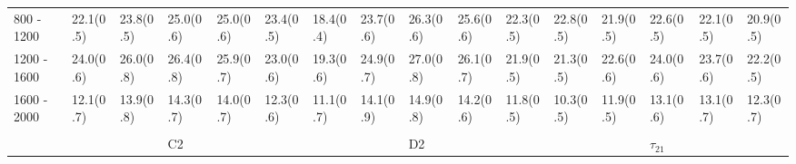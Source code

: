 \begin{table}
{\begin{tabular}{llllllllllllllll}
\multicolumn{1}{l||}{800 - 1200}     & \multicolumn{1}{l|}{22.1(0.5)}        & \multicolumn{1}{l|}{23.8(0.5)} & \multicolumn{1}{l|}{25.0(0.6)} 		& \multicolumn{1}{l|}{25.0(0.6)} & \multicolumn{1}{l||}{23.4(0.5)} 		& \multicolumn{1}{l|}{18.4(0.4)}        & \multicolumn{1}{l|}{23.7(0.6)} & \multicolumn{1}{l|}{\cellcolor{Red!50}26.3(0.6)} 							& \multicolumn{1}{l|}{25.6(0.6)} 		& \multicolumn{1}{l||}{22.3(0.5)} & \multicolumn{1}{l|}{22.8(0.5)}        & \multicolumn{1}{l|}{21.9(0.5)} & \multicolumn{1}{l|}{22.6(0.5)} & \multicolumn{1}{l|}{22.1(0.5)} & \multicolumn{1}{l|}{20.9(0.5)} \\
\multicolumn{1}{l||}{1200 - 1600}    & \multicolumn{1}{l|}{24.0(0.6)}        & \multicolumn{1}{l|}{26.0(0.8)} & \multicolumn{1}{l|}{26.4(0.8)} 		& \multicolumn{1}{l|}{25.9(0.7)} & \multicolumn{1}{l||}{23.0(0.6)} 		& \multicolumn{1}{l|}{19.3(0.6)}        & \multicolumn{1}{l|}{24.9(0.7)} & \multicolumn{1}{l|}{\cellcolor{Red!50}27.0(0.8)} 		& \multicolumn{1}{l|}{26.1(0.7)} 						& \multicolumn{1}{l||}{21.9(0.5)} & \multicolumn{1}{l|}{21.3(0.5)}        & \multicolumn{1}{l|}{22.6(0.6)} & \multicolumn{1}{l|}{24.0(0.6)} & \multicolumn{1}{l|}{23.7(0.6)} & \multicolumn{1}{l|}{22.2(0.5)} \\
\multicolumn{1}{l||}{1600 - 2000}    & \multicolumn{1}{l|}{12.1(0.7)}        & \multicolumn{1}{l|}{13.9(0.8)} & \multicolumn{1}{l|}{14.3(0.7)}  	& \multicolumn{1}{l|}{14.0(0.7)} & \multicolumn{1}{l||}{12.3(0.6)} 		& \multicolumn{1}{l|}{11.1(0.7)}        & \multicolumn{1}{l|}{14.1(0.9)} & \multicolumn{1}{l|}{\cellcolor{Red!50}14.9(0.8)} 		& \multicolumn{1}{l|}{14.2(0.6)} 						& \multicolumn{1}{l||}{11.8(0.5)} & \multicolumn{1}{l|}{10.3(0.5)}        & \multicolumn{1}{l|}{11.9(0.5)} & \multicolumn{1}{l|}{13.1(0.6)} & \multicolumn{1}{l|}{13.1(0.7)} & \multicolumn{1}{l|}{12.3(0.7)} \\ \hline
                                    &                                  &                           &                           &                	           &                           &                                  &                           &                           &                           &                           &                                  &                           &                           &                           &                           \\
\rowcolor{Gray}\multicolumn{1}{l||}{\textbf{TAS}}            &                                  &                           & C2                        &                           & \multicolumn{1}{l|}{}     &                                  &                           & D2                        &                           & \multicolumn{1}{l|}{}     &                                  &                           & $\tau_{21}$               &                           & \multicolumn{1}{l|}{}     \\ \hline

\end{tabular}}
\end{table}
